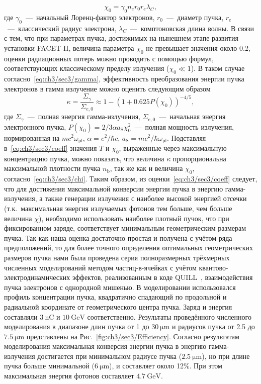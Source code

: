 \begin{equation}
    \label{eq:ch3/sec3/chi}
    \chi_0 = \gamma_0 n_e r_0 r_e \lambda_C, 
\end{equation}
где $\gamma_0$~---~начальный Лоренц-фактор электронов, $r_0$~---~диаметр пучка, {$r_e$~---~классический радиус электрона}, $\lambda_C$~---~комптоновская длина волны.
В связи с тем, что при параметрах пучка, достижимых на нынешнем этапе развития установки FACET-II, величина параметра $\chi_0$ не превышает значения около 0.2, оценки радиационных потерь можно проводить с помощью формул, соответствующих классическому пределу излучения ($\chi_0 \ll 1$).
В таком случае согласно~\eqref{eq:ch3/sec3/gamma}, эффективность преобразования энергии пучка электронов в гамма излучение можно оценить следующим образом
\begin{equation}
    \label{eq:ch3/sec3/coeff}
    \kappa = \frac{\Sigma_\gamma}{\Sigma_{e,0}} \approx 1 - {\left( 1 + 0.625 P(\chi_0) \right)}^{-4/5},
\end{equation}
где $\Sigma_\gamma$~---~полная энергия гамма-излучения, $\Sigma_{e,0}$~---~начальная энергия электронного пучка, $P(\chi_0) = 2/3 \alpha a_\mathrm{S} \chi_0^2$~---~полная мощность излучения, нормированная на $mc^2\omega_\mathrm{pl}$, $\alpha=e^2/\hbar c$, $a_\mathrm{S} = mc^2/\hbar\omega_\mathrm{pl}$.
Подставляя в~\eqref{eq:ch3/sec3/coeff} значения $T$ и $\chi_0$, выраженные через максимальную концентрацию пучка, можно показать, что величина $\kappa$ пропорциональна максимальной плотности пучка $n_\mathrm{b}$, так же как и величина $\chi_0$, согласно~\eqref{eq:ch3/sec3/chi}.
Таким образом, из оценки~\eqref{eq:ch3/sec3/coeff} следует, что для достижения максимальной конверсии энергии пучка в энергию гамма-излучения, а также генерации излучения с наиболее высокой энергией отсечки (т.к.~максимальная энергия излучаемых фотонов тем больше, чем больше величина $\chi$), необходимо использовать наиболее плотный пучок, что при фиксированном заряде, соответствует минимальным геометрическим размерам пучка. 
Так как наша оценка достаточно простая и получена с учётом ряда предположений, то для более точного определения оптимальных геометрических размеров пучка нами была проведена серия полноразмерных трёхмерных численных моделирований методом частиц-в-ячейках с учётом квантово-электродинамических эффектов, реализованным в коде QUILL~\cite{QUILL}, взаимодействия пучка электронов с однородной мишенью.
В моделировании использовался профиль концентрации пучка, квадратично спадающий по продольной и радиальной координате от геометрического центра пучка.
Заряд и энергия составляли $\SI{3}{\nano\coulomb}$ и $\SI{10}{\giga\electronvolt}$ соответственно.
Результаты проведённого численного моделирования в диапазоне длин пучка от 1 до $\SI{30}{\um}$ и радиусов пучка от 2.5 до $\SI{7.5}{\um}$ представлены на Рис.~\ref{fig:ch3/sec3/Efficiency}.
Согласно результатам моделирования максимальная конверсия энергии пучка в энергию гамма-излучения достигается при минимальном радиусе пучка ($\SI{2.5}{\um}$), но при длине пучка больше минимальной ($\SI{6}{\um}$), и составляет около 12\%.
При этом максимальная энергия фотонов составляет $\SI{4.7}{\giga\electronvolt}$.
  
